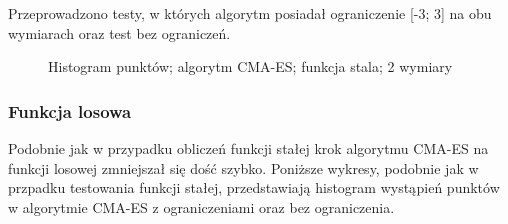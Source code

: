 \documentclass{mini}
\begin{document}
Przeprowadzono testy, w których algorytm posiadał ograniczenie [-3; 3] na obu wymiarach oraz test bez ograniczeń.

\begin{figure}[H]
\centering
{}
\quad
{}
\caption{Histogram punktów; algorytm CMA-ES; funkcja stala; 2 wymiary}
\end{figure}

\subsubsection*{Funkcja losowa}
Podobnie jak w przypadku obliczeń funkcji stałej krok algorytmu CMA-ES na funkcji losowej zmniejszał się dość szybko. Poniższe wykresy, podobnie jak w przpadku testowania funkcji stałej, przedstawiają histogram wystąpień punktów w algorytmie CMA-ES z ograniczeniami oraz bez ograniczenia.
\end{document}
